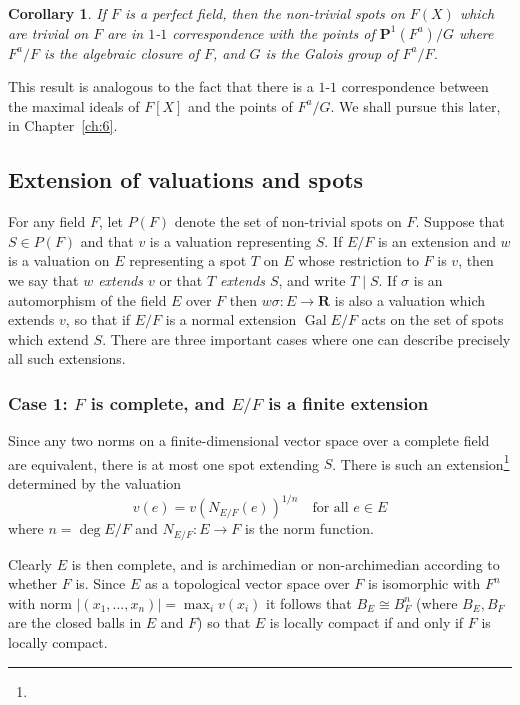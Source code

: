 \documentclass[10pt]{article}
\newtheorem{coro}[theo]{Corollary}
\theoremstyle{definition}
\def\RR{\mathbf{R}}
\def\PP{\mathbf{P}}
\DeclareMathOperator{\Gal}{Gal}
\def\fnfoon{}
\begin{document}
\begin{coro}
\label{4.1.11}
If $F$ is a perfect field, then the non-trivial spots on $F(X)$ which are trivial on $F$ are in $1$-$1$ correspondence with the points of $\PP^1(F^a)/G$ where $F^a/F$ is the algebraic closure of $F$, and $G$ is the Galois group of $F^a /F$.
\end{coro}


This result is analogous to the fact that there is a $1$-$1$ correspondence between the maximal ideals of $F[X]$ and the points of $F^a / G$.
We shall pursue this later, in Chapter~\ref{ch:6}.


\subsection{Extension of valuations and spots}
\label{ch:4.2}

For any field $F$, let $P(F)$ denote the set of non-trivial spots on $F$.
Suppose that $S \in P(F)$ and that $v$ is a valuation representing $S$.
If $E/F$ is an extension and $w$ is a valuation on $E$ representing a spot $T$ on $E$ whose restriction to $F$ is $v$, then we say that \emph{$w$ extends $v$} or that \emph{$T$ extends $S$}, and write $T \mid S$.
If $\sigma$ is an automorphism of the field $E$ over $F$ then $w\sigma : E \to \RR$ is also a valuation which extends $v$, so that if $E/F$ is a normal extension $\Gal E/F$ acts on the set of spots which extend $S$.
There are three important cases where one can describe precisely all such extensions.


\subsubsection[Case 1]{Case 1: $F$ is complete, and $E/F$ is a finite extension}
\label{4.2.1}

Since any two norms on a finite-dimensional vector space over a complete field are equivalent, there is at most one spot extending $S$.
There is such an extension\footnote{\fnfoon} determined by the valuation
\[
v(e) = v(N_{E/F}(e))^{1/n}
\quad
\text{for all $e \in E$}
\]
where $n = \deg E/F$ and $N_{E/F} : E \to F$ is the norm function.

Clearly $E$ is then complete, and is archimedian or non-archimedian according to whether $F$ is.
Since $E$ as a topological vector space over $F$ is isomorphic with $F^n$ with norm $|(x_1, \ldots, x_n)| = \max_i v(x_i)$ it follows that $B_E \cong B_F^n$ (where $B_E, B_F$ are the closed balls in $E$ and $F$) so that $E$ is locally compact if and only if $F$ is locally compact.
\end{document}
